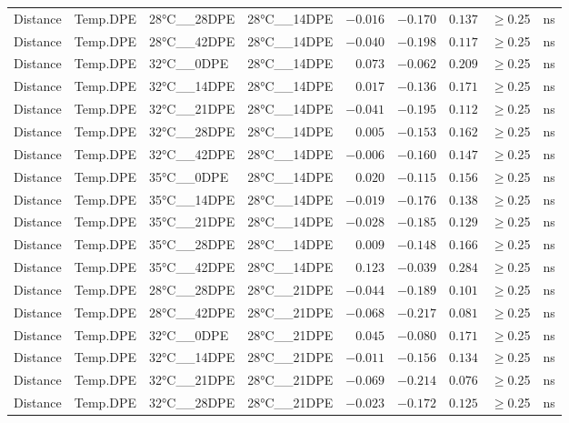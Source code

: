 \documentclass[
]{article}
\begin{document}
\begin{longtable}{llllrrrrl}
Distance & Temp.DPE & 28°C\_\_28DPE & 28°C\_\_14DPE & $-0.016$ & $-0.170$ & $0.137$ & $\geq$0.25 & ns \\ 
Distance & Temp.DPE & 28°C\_\_42DPE & 28°C\_\_14DPE & $-0.040$ & $-0.198$ & $0.117$ & $\geq$0.25 & ns \\ 
Distance & Temp.DPE & 32°C\_\_0DPE & 28°C\_\_14DPE & $0.073$ & $-0.062$ & $0.209$ & $\geq$0.25 & ns \\ 
Distance & Temp.DPE & 32°C\_\_14DPE & 28°C\_\_14DPE & $0.017$ & $-0.136$ & $0.171$ & $\geq$0.25 & ns \\ 
Distance & Temp.DPE & 32°C\_\_21DPE & 28°C\_\_14DPE & $-0.041$ & $-0.195$ & $0.112$ & $\geq$0.25 & ns \\ 
Distance & Temp.DPE & 32°C\_\_28DPE & 28°C\_\_14DPE & $0.005$ & $-0.153$ & $0.162$ & $\geq$0.25 & ns \\ 
Distance & Temp.DPE & 32°C\_\_42DPE & 28°C\_\_14DPE & $-0.006$ & $-0.160$ & $0.147$ & $\geq$0.25 & ns \\ 
Distance & Temp.DPE & 35°C\_\_0DPE & 28°C\_\_14DPE & $0.020$ & $-0.115$ & $0.156$ & $\geq$0.25 & ns \\ 
Distance & Temp.DPE & 35°C\_\_14DPE & 28°C\_\_14DPE & $-0.019$ & $-0.176$ & $0.138$ & $\geq$0.25 & ns \\ 
Distance & Temp.DPE & 35°C\_\_21DPE & 28°C\_\_14DPE & $-0.028$ & $-0.185$ & $0.129$ & $\geq$0.25 & ns \\ 
Distance & Temp.DPE & 35°C\_\_28DPE & 28°C\_\_14DPE & $0.009$ & $-0.148$ & $0.166$ & $\geq$0.25 & ns \\ 
Distance & Temp.DPE & 35°C\_\_42DPE & 28°C\_\_14DPE & $0.123$ & $-0.039$ & $0.284$ & $\geq$0.25 & ns \\ 
Distance & Temp.DPE & 28°C\_\_28DPE & 28°C\_\_21DPE & $-0.044$ & $-0.189$ & $0.101$ & $\geq$0.25 & ns \\ 
Distance & Temp.DPE & 28°C\_\_42DPE & 28°C\_\_21DPE & $-0.068$ & $-0.217$ & $0.081$ & $\geq$0.25 & ns \\ 
Distance & Temp.DPE & 32°C\_\_0DPE & 28°C\_\_21DPE & $0.045$ & $-0.080$ & $0.171$ & $\geq$0.25 & ns \\ 
Distance & Temp.DPE & 32°C\_\_14DPE & 28°C\_\_21DPE & $-0.011$ & $-0.156$ & $0.134$ & $\geq$0.25 & ns \\ 
Distance & Temp.DPE & 32°C\_\_21DPE & 28°C\_\_21DPE & $-0.069$ & $-0.214$ & $0.076$ & $\geq$0.25 & ns \\ 
Distance & Temp.DPE & 32°C\_\_28DPE & 28°C\_\_21DPE & $-0.023$ & $-0.172$ & $0.125$ & $\geq$0.25 & ns \\ 

\end{longtable}
\end{document}
